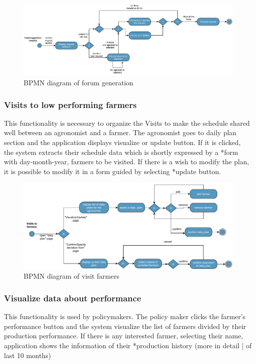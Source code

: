 \begin{figure}[H]
	\centering
    \includegraphics[width=\textwidth]{Images/BPMN/help-suggestion-request.pdf}
	\caption{\label{fig:bpmn_forum_generation}BPMN diagram of forum generation}
\end{figure}

\subsubsection{Visits to low performing farmers}
This functionality is necessary to organize the Visits to make the schedule shared well 
between an agronomist and a farmer. The agronomist goes to daily plan section and the 
application displays visualize or update button. If it is clicked, the system extracts their schedule
data which is shortly expressed by a *form with day-month-year, farmers to be visited.
If there is a wish to modify the plan, it is possible to modify it in a form guided by selecting 
*update button.

\begin{figure}[H]
	\centering
    \includegraphics[width=\textwidth]{Images/BPMN/visit.pdf}
	\caption{\label{fig:bpmn_visit}BPMN diagram of visit farmers}
\end{figure}

\subsubsection{Visualize data about performance}
This functionality is used by policymakers. The policy maker clicks the farmer's performance button and the system visualize the list of farmers divided by their production performance. If 
there is any interested farmer, selecting their name, application shows the information of their
*production history (more in detail | of last 10 months) 

